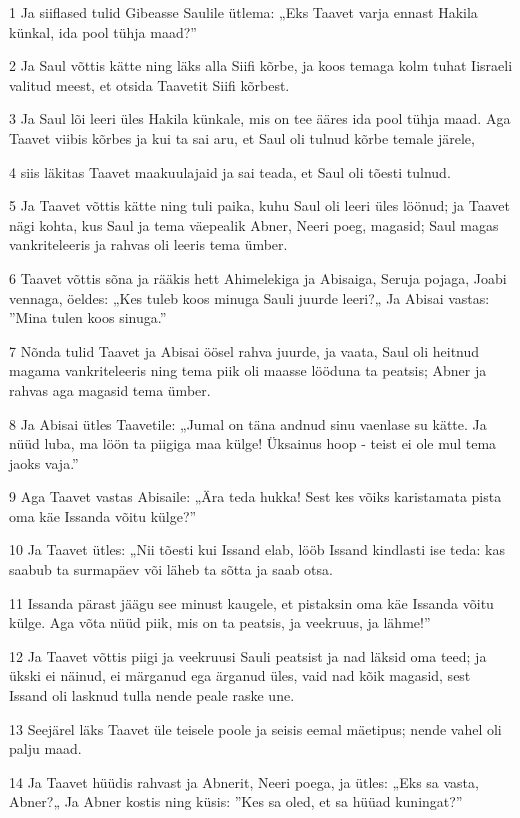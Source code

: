 \par 1 Ja siiflased tulid Gibeasse Saulile ütlema: „Eks Taavet varja ennast Hakila künkal, ida pool tühja maad?”
\par 2 Ja Saul võttis kätte ning läks alla Siifi kõrbe, ja koos temaga kolm tuhat Iisraeli valitud meest, et otsida Taavetit Siifi kõrbest.
\par 3 Ja Saul lõi leeri üles Hakila künkale, mis on tee ääres ida pool tühja maad. Aga Taavet viibis kõrbes ja kui ta sai aru, et Saul oli tulnud kõrbe temale järele,
\par 4 siis läkitas Taavet maakuulajaid ja sai teada, et Saul oli tõesti tulnud.
\par 5 Ja Taavet võttis kätte ning tuli paika, kuhu Saul oli leeri üles löönud; ja Taavet nägi kohta, kus Saul ja tema väepealik Abner, Neeri poeg, magasid; Saul magas vankriteleeris ja rahvas oli leeris tema ümber.
\par 6 Taavet võttis sõna ja rääkis hett Ahimelekiga ja Abisaiga, Seruja pojaga, Joabi vennaga, öeldes: „Kes tuleb koos minuga Sauli juurde leeri?„ Ja Abisai vastas: ”Mina tulen koos sinuga.”
\par 7 Nõnda tulid Taavet ja Abisai öösel rahva juurde, ja vaata, Saul oli heitnud magama vankriteleeris ning tema piik oli maasse lööduna ta peatsis; Abner ja rahvas aga magasid tema ümber.
\par 8 Ja Abisai ütles Taavetile: „Jumal on täna andnud sinu vaenlase su kätte. Ja nüüd luba, ma löön ta piigiga maa külge! Üksainus hoop - teist ei ole mul tema jaoks vaja.”
\par 9 Aga Taavet vastas Abisaile: „Ära teda hukka! Sest kes võiks karistamata pista oma käe Issanda võitu külge?”
\par 10 Ja Taavet ütles: „Nii tõesti kui Issand elab, lööb Issand kindlasti ise teda: kas saabub ta surmapäev või läheb ta sõtta ja saab otsa.
\par 11 Issanda pärast jäägu see minust kaugele, et pistaksin oma käe Issanda võitu külge. Aga võta nüüd piik, mis on ta peatsis, ja veekruus, ja lähme!”
\par 12 Ja Taavet võttis piigi ja veekruusi Sauli peatsist ja nad läksid oma teed; ja ükski ei näinud, ei märganud ega ärganud üles, vaid nad kõik magasid, sest Issand oli lasknud tulla nende peale raske une.
\par 13 Seejärel läks Taavet üle teisele poole ja seisis eemal mäetipus; nende vahel oli palju maad.
\par 14 Ja Taavet hüüdis rahvast ja Abnerit, Neeri poega, ja ütles: „Eks sa vasta, Abner?„ Ja Abner kostis ning küsis: ”Kes sa oled, et sa hüüad kuningat?”
